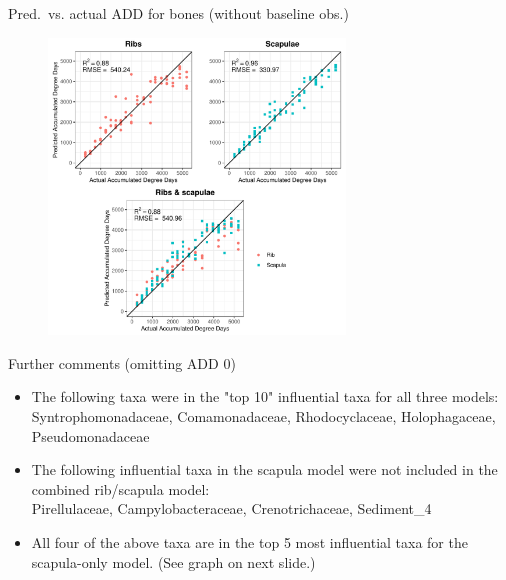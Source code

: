 \documentclass{beamer}
\begin{document}
\begin{frame}{Pred.\ vs. actual ADD for bones (without baseline obs.)}

  \begin{center}
    \begin{figure}
      \includegraphics[height=3.1in]
        {w_bones/bacteria/use_families/hl_combined_family_no_baseline_predicted_vs_actual_ADD}
    \end{figure}
  \end{center}
    
\end{frame}




\begin{frame}{Further comments (omitting ADD 0)}
  
  \begin{itemize}
    \item The following taxa were in the "top 10" influential taxa for all
    three models:\\
    Syntrophomonadaceae, Comamonadaceae, Rhodocyclaceae, Holophagaceae,
    Pseudomonadaceae
    \item The following influential taxa in the scapula model were not included
    in the combined rib/scapula model:\\
    Pirellulaceae, Campylobacteraceae, Crenotrichaceae, Sediment\_4
    \item All four of the above taxa are in the top 5 most influential taxa for
    the scapula-only model.  (See graph on next slide.)
    
  \end{itemize}

\end{frame}
\end{document}
